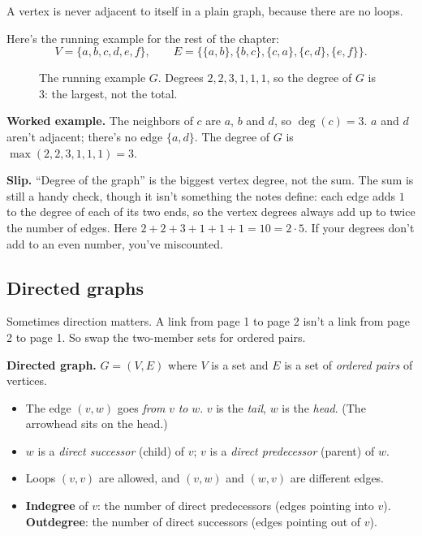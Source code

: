A vertex is never adjacent to itself in a plain graph, because there are no loops.

Here's the running example for the rest of the chapter:
\[V=\{a,b,c,d,e,f\},\qquad E=\{\{a,b\},\{b,c\},\{c,a\},\{c,d\},\{e,f\}\}.\]

\begin{figure}[H]
\centering
{}
\caption{The running example $G$. Degrees $2,2,3,1,1,1$, so the degree of $G$ is $3$: the largest, not the total.}
\end{figure}

\textbf{Worked example.} The neighbors of $c$ are $a$, $b$ and $d$, so $\deg(c)=3$. $a$ and $d$ aren't adjacent; there's no edge $\{a,d\}$. The degree of $G$ is $\max(2,2,3,1,1,1)=3$.

\textbf{Slip.} ``Degree of the graph'' is the biggest vertex degree, not the sum. The sum is still a handy check, though it isn't something the notes define: each edge adds $1$ to the degree of each of its two ends, so the vertex degrees always add up to twice the number of edges. Here $2+2+3+1+1+1=10=2\cdot 5$. If your degrees don't add to an even number, you've miscounted.

\subsection{Directed graphs}

Sometimes direction matters. A link from page 1 to page 2 isn't a link from page 2 to page 1. So swap the two-member sets for ordered pairs.

\begin{notebox}
\textbf{Directed graph.} $G=(V,E)$ where $V$ is a set and $E$ is a set of \emph{ordered pairs} of vertices.
\begin{itemize}
\item The edge $(v,w)$ goes \emph{from} $v$ \emph{to} $w$. $v$ is the \emph{tail}, $w$ is the \emph{head}. (The arrowhead sits on the head.)
\item $w$ is a \emph{direct successor} (child) of $v$; $v$ is a \emph{direct predecessor} (parent) of $w$.
\item Loops $(v,v)$ are allowed, and $(v,w)$ and $(w,v)$ are different edges.
\item \textbf{Indegree} of $v$: the number of direct predecessors (edges pointing into $v$). \textbf{Outdegree}: the number of direct successors (edges pointing out of $v$).
\end{itemize}
\end{notebox}

